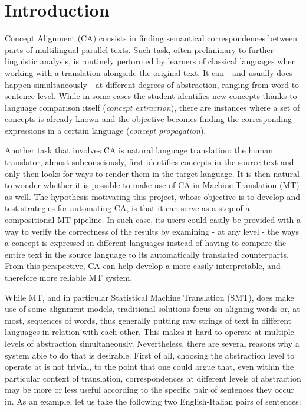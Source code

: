 \chapter{Introduction} \label{ch1}
Concept Alignment (CA) consists in finding semantical correspondences between parts of multilingual parallel texts.
Such task, often preliminary to further linguistic analysis, is routinely performed by learners of classical languages when working with a translation alongside the original text. It can - and usually does happen simultaneously - at different degrees of abstraction, ranging from word to sentence level. 
While in some cases the student identifies new concepts thanks to language comparison itself (\textit{concept extraction}), there are instances where a set of concepts is already known and the objective becomes finding the corresponding expressions in a certain language (\textit{concept propagation}). \smallskip

Another task that involves CA is natural language translation: the human translator, almost subconsciously, first identifies concepts in the source text and only then looks for ways to render them in the target language. 
It is then natural to wonder whether it is possible to make use of CA in Machine Translation (MT) as well.
The hypothesis motivating this project, whose objective is to develop and test strategies for automating CA, is that it can serve as a step of a compositional MT pipeline. 
In such case, its users could easily be provided with a way to verify the correctness of the results by examining - at any level - the ways a concept is expressed in different languages instead of having to compare the entire text in the source language to its automatically translated counterparts.
From this perspective, CA can help develop a more easily interpretable, and therefore more reliable MT system. \smallskip

While MT, and in particular Statistical Machine Translation (SMT), does make use of some alignment models, traditional solutions focus on aligning words or, at most, sequences of words, thus generally putting raw strings of text in different languages in relation with each other. This makes it hard to operate at multiple levels of abstraction simultaneously. 
Nevertheless, there are several reasons why a system able to do that is desirable. First of all, choosing the abstraction level to operate at is not trivial, to the point that one could argue that, even within the particular context of translation, correspondences at different levels of abstraction may be more or less useful according to the specific pair of sentences they occur in. 
As an example, let us take the following two English-Italian pairs of sentences: \smallskip

